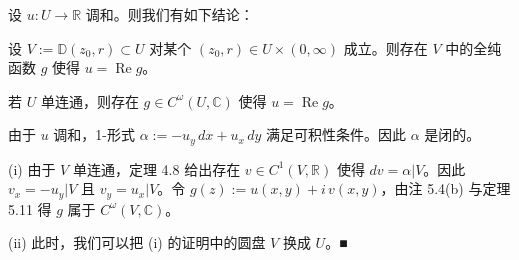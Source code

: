 \begin{proposition}

设 $ u : U \to \mathbb{R} $ 调和。则我们有如下结论：

\begin{subitems}
\item

设 $ V := \mathbb{D}(z_{0},r) \subset U $ 对某个 $ (z_{0},r) \in U\times(0,\infty) $ 成立。则存在 $ V $ 中的全纯函数 $ g $ 使得 $ u = \operatorname{Re} g $。

\item

若 $ U $ 单连通，则存在 $ g \in C^{\omega}(U,\mathbb{C}) $ 使得 $ u = \operatorname{Re} g $。

\proofhead
由于 $ u $ 调和，1-形式 $ \alpha := -u_{y}\,dx + u_{x}\,dy $ 满足可积性条件。因此 $ \alpha $ 是闭的。
\end{subitems}

(i) 由于 $ V $ 单连通，定理 4.8 给出存在 $ v \in C^{1}(V,\mathbb{R}) $ 使得 $ dv = \alpha|V $。因此 $ v_{x} = -u_{y}|V $ 且 $ v_{y} = u_{x}|V $。令 $ g(z) := u(x,y) + i\,v(x,y) $，由注 5.4(b) 与定理 5.11 得 $ g $ 属于 $ C^{\omega}(V,\mathbb{C}) $。

(ii) 此时，我们可以把 (i) 的证明中的圆盘 $ V $ 换成 $ U $。\nobreak\hspace{0.35em}■

\end{proposition}

